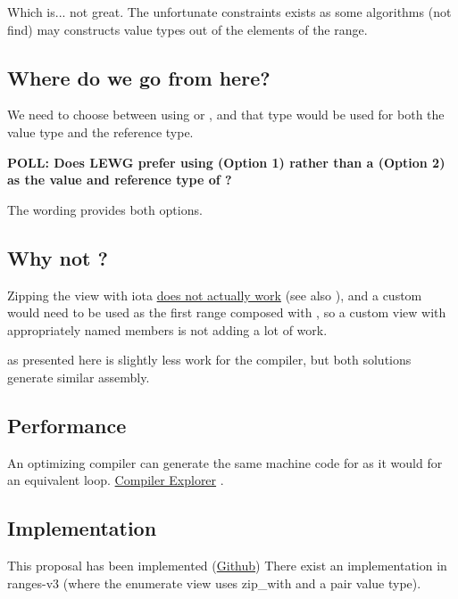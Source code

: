 \documentclass{wg21}
\begin{document}
Which is... not great.
The unfortunate  constraints exists as some algorithms (not find) may constructs value types out of the elements of the range.

\subsection{Where do we go from here?}

We need to choose between using  or , and that type would be used for both the value type and the reference type.

\textbf{POLL: Does LEWG prefer using  (Option 1) rather than a  (Option 2) as the value and reference type of ?}

The wording provides both options.

\subsection{Why not ?}
Zipping the view with iota \href{https://github.com/ericniebler/range-v3/issues/1141}{does not actually work}
(see also \href{http://www.open-std.org/jtc1/sc22/wg21/docs/papers/2020/p2214r0.html#enumerates-first-range}{}),
and a custom  would need to be used as the first range composed with , so a custom  view with
appropriately named members is not adding a lot of work.

 as presented here is slightly less work for the compiler, but both solutions generate similar assembly.


\subsection{Performance}

An optimizing compiler can generate the same machine code for  as it would for an equivalent  loop.  \href{https://godbolt.org/z/2Kxo8d}{Compiler Explorer} .


\subsection{Implementation}

This proposal has been implemented (\href{https://github.com/cor3ntin/rangesnext/blob/master/include/cor3ntin/rangesnext/enumerate.hpp}{Github})
There exist an implementation in ranges-v3 (where the enumerate view uses zip_with and a pair value type).
\end{document}
